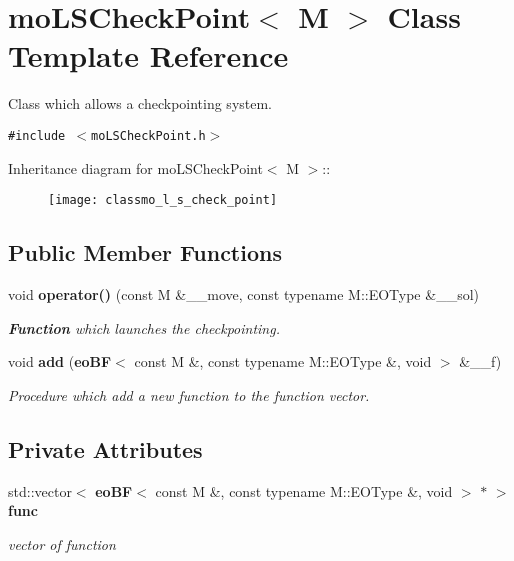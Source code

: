 \section{mo\-LSCheck\-Point$<$ M $>$ Class Template Reference}
\label{classmo_l_s_check_point}
Class which allows a checkpointing system.  


{\tt \#include $<$mo\-LSCheck\-Point.h$>$}

Inheritance diagram for mo\-LSCheck\-Point$<$ M $>$::\begin{figure}[H]
\begin{center}
\leavevmode
\texttt{[image: classmo\_l\_s\_check\_point]}
\end{center}
\end{figure}
\subsection*{Public Member Functions}
\begin{CompactItemize}
\item 
void {\bf operator()} (const M \&\_\-\_\-move, const typename M::EOType \&\_\-\_\-sol)
\begin{CompactList}\small\item\em {\bf Function} which launches the checkpointing. \item\end{CompactList}\item 
void {\bf add} ({\bf eo\-BF}$<$ const M \&, const typename M::EOType \&, void $>$ \&\_\-\_\-f)
\begin{CompactList}\small\item\em Procedure which add a new function to the function vector. \item\end{CompactList}\end{CompactItemize}
\subsection*{Private Attributes}
\begin{CompactItemize}
\item 
std::vector$<$ {\bf eo\-BF}$<$ const M \&, const typename M::EOType \&, void $>$ $\ast$ $>$ {\bf func}\label{classmo_l_s_check_point_ff2a31ee5689a804bd9a572c51a36ca4}

\begin{CompactList}\small\item\em vector of function \item\end{CompactList}\end{CompactItemize}


